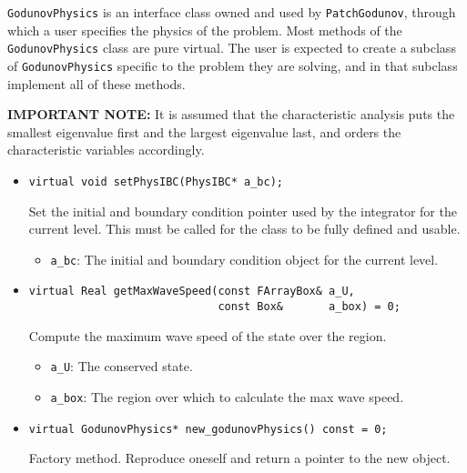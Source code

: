 {\tt GodunovPhysics} is an interface class owned and used by {\tt PatchGodunov},
through which a user specifies the physics of the problem.  
Most methods of the {\tt GodunovPhysics} class are pure virtual.  The user
is expected to create a subclass of {\tt GodunovPhysics} specific to the
problem they are solving, and in that subclass implement all of these methods.
 
{\bf IMPORTANT NOTE:} It is assumed that the characteristic analysis puts the
smallest eigenvalue first and the largest eigenvalue last, and orders the
characteristic variables accordingly.
\begin{itemize}

\item \begin{small}\begin{verbatim}
virtual void setPhysIBC(PhysIBC* a_bc);
\end{verbatim}\end{small}
Set the initial and boundary condition pointer used by the integrator for the
current level.  This must be called for the class to be fully defined
and usable.
\begin{itemize}
\item \verb/a_bc/:  The initial and boundary condition object for the current
level.
\end{itemize}

\item \begin{small}\begin{verbatim}
virtual Real getMaxWaveSpeed(const FArrayBox& a_U,
                             const Box&       a_box) = 0;
\end{verbatim}\end{small}
Compute the maximum wave speed of the state over the region.
\begin{itemize}
\item \verb/a_U/:  The conserved state.
\vspace{-0.07in}
\item \verb/a_box/:  The region over which to calculate the max wave speed.
\end{itemize}

\item \begin{small}\begin{verbatim}
virtual GodunovPhysics* new_godunovPhysics() const = 0;
\end{verbatim}\end{small}
Factory method.  Reproduce oneself and return a pointer to the new object.


\end{itemize}
